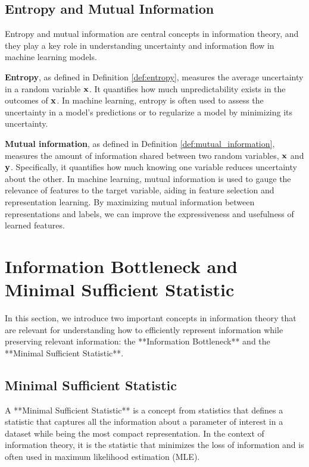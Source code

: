\documentclass[11pt, oneside]{book}
\theoremstyle{plain}
\theoremstyle{definition}
\theoremstyle{remark}
\begin{document}
\subsection{Entropy and Mutual Information}

Entropy and mutual information are central concepts in information theory, and they play a key role in understanding uncertainty and information flow in machine learning models. 

\textbf{Entropy}, as defined in Definition \ref{def:entropy}, measures the average uncertainty in a random variable ${\mathbf{x}}$. It quantifies how much unpredictability exists in the outcomes of ${\mathbf{x}}$. In machine learning, entropy is often used to assess the uncertainty in a model's predictions or to regularize a model by minimizing its uncertainty.

\textbf{Mutual information}, as defined in Definition \ref{def:mutual_information}, measures the amount of information shared between two random variables, ${\mathbf{x}}$ and ${\mathbf{y}}$. Specifically, it quantifies how much knowing one variable reduces uncertainty about the other. In machine learning, mutual information is used to gauge the relevance of features to the target variable, aiding in feature selection and representation learning. By maximizing mutual information between representations and labels, we can improve the expressiveness and usefulness of learned features.

\section{Information Bottleneck and Minimal Sufficient Statistic}

In this section, we introduce two important concepts in information theory that are relevant for understanding how to efficiently represent information while preserving relevant information: the **Information Bottleneck** and the **Minimal Sufficient Statistic**.


\subsection{Minimal Sufficient Statistic}

A **Minimal Sufficient Statistic** is a concept from statistics that defines a statistic that captures all the information about a parameter of interest in a dataset while being the most compact representation. In the context of information theory, it is the statistic that minimizes the loss of information and is often used in maximum likelihood estimation (MLE).
\end{document}

